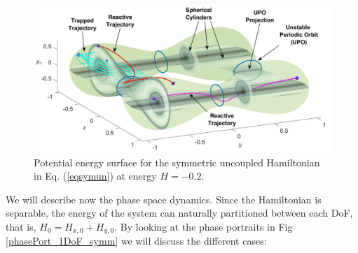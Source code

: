 \documentclass[10pt,aps,onecolumn,superscriptaddress]{revtex4-2}
\begin{document}
\begin{figure}[htbp]
	\begin{center}
		\includegraphics[scale=0.3]{enSurf_LDs_symm}
	\end{center}
	\caption{Potential energy surface for the symmetric uncoupled Hamiltonian in Eq. (\ref{eqsymun}) at energy $H = -0.2$.}
	\label{LD_pot_neg}
\end{figure}

We will describe now the phase space dynamics. Since the Hamiltonian is separable, the energy of the system can naturally partitioned between each DoF, that is, $H_{0}=H_{x,0}+H_{y,0}$. By looking at the phase portraits in Fig \ref{phasePort_1DoF_symm} we will discuss the different cases:
\end{document}

